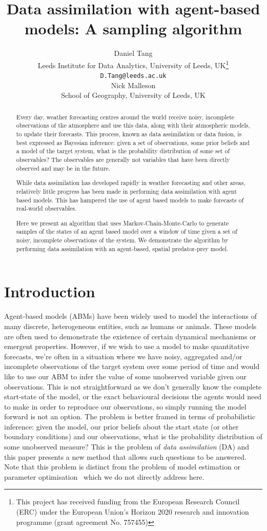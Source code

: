 \documentclass{article}
\title{Data assimilation with agent-based models: A sampling algorithm}
\author{
  Daniel Tang\\
    Leeds Institute for Data Analytics, University of Leeds, UK\thanks{This project has received funding from the European Research Council (ERC) under the European Union’s Horizon 2020 research and innovation programme (grant agreement No. 757455)}\\
  \texttt{D.Tang@leeds.ac.uk}\\
  \AND
  Nick Malleson\\
  School of Geography, University of Leeds, UK\\  
}
\begin{document}
\maketitle

\begin{abstract}
Every day, weather forecasting centres around the world receive noisy, incomplete observations of the atmosphere and use this data, along with their atmospheric models, to update their forecasts. This process, known as data assimilation or data fusion, is best expressed as Bayesian inference: given a set of observations, some prior beliefs and a model of the target system, what is the probability distribution of some set of observables? The observables are generally not variables that have been directly observed and may be in the future.

While data assimilation has developed rapidly in weather forecasting and other areas, relatively little progress has been made in performing data assimilation with agent based models. This has hampered the use of agent based models to make forecasts of real-world observables.

Here we present an algorithm that uses Markov-Chain-Monte-Carlo to generate samples of the states of an agent based model over a window of time given a set of noisy, incomplete observations of the system. We demonstrate the algorithm by performing data assimilation with an agent-based, spatial predator-prey model.
\end{abstract}


\section{Introduction}

Agent-based models (ABMs) have been widely used to model the interactions of many discrete, heterogeneous entities, such as humans or animals. These models are often used to demonstrate the existence of certain dynamical mechanisms or emergent properties. However, if we wish to use a model to make quantitative forecasts, we're often in a situation where we have noisy, aggregated and/or incomplete observations of the target system over some period of time and would like to use our ABM to infer the value of some unobserved variable given our observations. This is not straightforward as we don't generally know the complete start-state of the model, or the exact behavioural decisions the agents would need to make in order to reproduce our observations, so simply running the model forward is not an option. The problem is better framed in terms of probabilistic inference: given the model, our prior beliefs about the start state (or other boundary conditions) and our observations, what is the probability distribution of some unobserved measure? This is the problem of \textit{data assimilation} (DA) and this paper presents a new method that allows such questions to be answered. Note that this problem is distinct from the problem of model estimation or parameter optimisation~\cite{thiele_facilitating_2014} which we do not directly address here.
\end{document}
